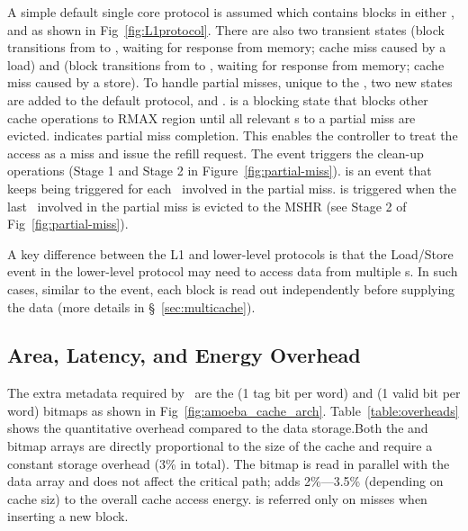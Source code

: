 \clearpage

A simple default single core protocol is assumed which contains blocks in either ,  and  as shown in Fig~\ref{fig:L1protocol}. There are also two transient states (block transitions from  to , waiting for  response from memory; cache miss caused by a load) and (block transitions from  to , waiting for  response from memory; cache miss caused by a store). To handle partial misses, unique to the \AC{}, two new states are added to the default protocol,  and .  is a blocking state that blocks other cache operations to RMAX region until all relevant \AB{}s to a partial miss are evicted.  indicates partial miss completion. This enables the controller to treat the access as a miss and issue the refill request. The  event triggers the clean-up operations (Stage 1 and Stage 2 in Figure~\ref{fig:partial-miss}).  is an event that keeps being triggered for each \AB\ involved in the partial miss.  is triggered when the last \AB\ involved in the partial miss is evicted to the MSHR (see Stage 2 of Fig~\ref{fig:partial-miss}).

A key difference between the L1 and lower-level protocols is that the Load/Store event in the lower-level protocol may need to access data from multiple \AB{}s. In such cases, similar to the  event, each block is read out independently before supplying the data (more details in \S~\ref{sec:multicache}).

\subsection{Area, Latency, and Energy Overhead}
\label{sec:area_latency_energy_overhead}

The extra metadata required by \AC\ are the (1 tag bit per word) and (1 valid bit per word) bitmaps as shown in Fig~\ref{fig:amoeba_cache_arch}. Table~\ref{table:overheads} shows the quantitative overhead compared to the data storage.Both the  and  bitmap arrays are directly proportional to the size of the cache and require a constant storage overhead (3\% in total). The  bitmap is read in parallel with the data array and does not affect the critical path;  adds 2\%---3.5\% (depending on cache siz) to the overall cache access energy. is referred only on misses when inserting a new block.

